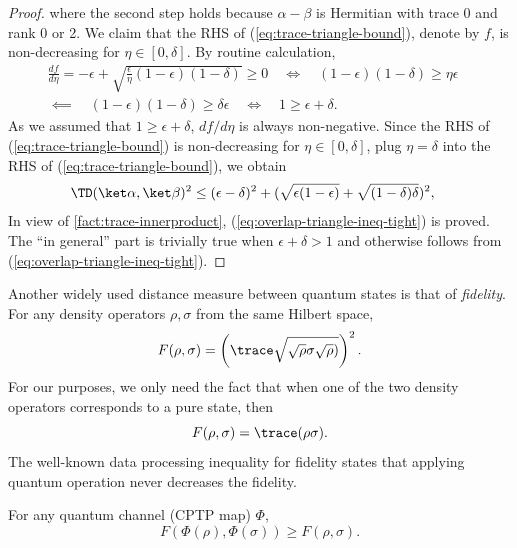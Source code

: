 \begin{proof}
where the second step holds because $\alpha-\beta$ is Hermitian with trace 0 and rank 0 or 2.
We claim that the RHS of (\ref{eq:trace-triangle-bound}), denote by $f$, is non-decreasing for $\eta\in[0,\delta]$. 
By routine calculation, 
\begin{align*}
    \frac{d f}{d\eta}  = -\epsilon + \sqrt{ \frac{\epsilon}{\eta} (1-\epsilon)(1-\delta)} \ge 0 \quad
    \iff \quad(1-\epsilon)(1-\delta) \ge \eta\epsilon \quad
    \\
    \impliedby 
    \quad
    (1-\epsilon)(1-\delta) \ge \delta\epsilon
    \quad
    \iff \quad 1 \ge \epsilon + \delta.
\end{align*}
As we assumed that $1 \ge \epsilon+\delta$, $df/d\eta$ is always non-negative.
Since the RHS of (\ref{eq:trace-triangle-bound}) is non-decreasing for $\eta\in[0,\delta]$, plug $\eta=\delta$ into the RHS of (\ref{eq:trace-triangle-bound}), we obtain
\begin{align*}
    \TD(\ket\alpha,\ket\beta) ^2
    &\le (\epsilon-\delta)^2 + (\sqrt{\epsilon(1-\epsilon)}+\sqrt{(1-\delta)\delta})^2,
\end{align*}
In view of \cref{fact:trace-innerproduct}, (\ref{eq:overlap-triangle-ineq-tight}) is proved. The ``in general'' part is trivially true when $\epsilon+\delta>1$ and otherwise follows from (\ref{eq:overlap-triangle-ineq-tight}).
\end{proof}

Another widely used distance measure between quantum states is that of \emph{fidelity}. For any density operators $\rho, \sigma$ from the same Hilbert space,
\begin{equation*}
    F(\rho, \sigma) = \left(\trace \sqrt{\sqrt\rho \sigma \sqrt\rho)}\right)^2.
\end{equation*}
For our purposes, we only need the fact that when one of the two density operators corresponds to a pure state, then
\begin{equation*}
    F(\rho,\sigma) = \trace(\rho\sigma).
\end{equation*}
The well-known data processing inequality for fidelity states that applying quantum operation never decreases the fidelity. 
\begin{fact}\label{fact:data-processing}
For any quantum channel (CPTP map) $\Phi$,
    \[F(\Phi(\rho), \Phi(\sigma)) \ge F(\rho, \sigma).\]
\end{fact}





